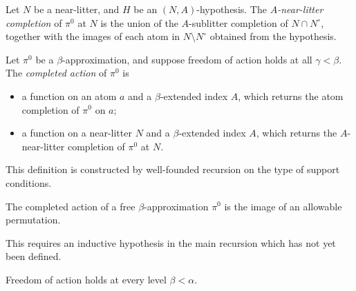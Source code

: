 \documentclass{article}
\begin{document}
\begin{definition}
    Let \( N \) be a near-litter, and \( H \) be an \( (N, A) \)-hypothesis.
    The \emph{\( A \)-near-litter completion} of \( \pi^0 \) at \( N \) is the union of the \( A \)-sublitter completion of \( N \cap N^\circ \), together with the images of each atom in \( N \setminus N^\circ \) obtained from the hypothesis.
\end{definition}
\begin{definition}
    Let \( \pi^0 \) be a \( \beta \)-approximation, and suppose freedom of action holds at all \( \gamma < \beta \).
    The \emph{completed action} of \( \pi^0 \) is
    \begin{itemize}
        \item a function on an atom \( a \) and a \( \beta \)-extended index \( A \), which returns the atom completion of \( \pi^0 \) on \( a \);
        \item a function on a near-litter \( N \) and a \( \beta \)-extended index \( A \), which returns the \( A \)-near-litter completion of \( \pi^0 \) at \( N \).
    \end{itemize}
\end{definition}
\begin{remark}
    This definition is constructed by well-founded recursion on the type of support conditions.
\end{remark}
\begin{lemma}
    The completed action of a free \( \beta \)-approximation \( \pi^0 \) is the image of an allowable permutation.
\end{lemma}
\begin{remark}
    This requires an inductive hypothesis in the main recursion which has not yet been defined.
\end{remark}
\begin{theorem}
    Freedom of action holds at every level \( \beta < \alpha \).
\end{theorem}
\end{document}

